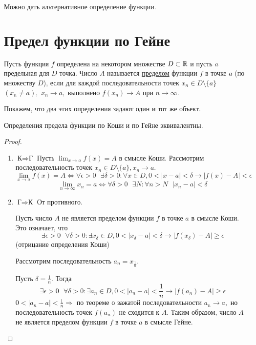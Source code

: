 	Можно дать альтернативное определение функции.
	
	\section{Предел функции по Гейне}
	
	\begin{theorem}
		Пусть функция $f$ определена на некотором множестве $D \subset \mathbb R$ и пусть $a$ предельная для $D$ точка. Число $A$ называется \underline{пределом} функции $f$ в точке $a$ (по множеству $D$), если для каждой последовательности точек $x_n \in D \setminus \{a\}$ $(x_n \neq a),$ $x_n \to a,$ выполнено $f(x_n) \to A$ при $n \to \infty.$
	\end{theorem}
	
	Покажем, что два этих определения задают один и тот же объект.
	
	\begin{theorem}
		Определения предела функции по Коши и по Гейне эквивалентны.
	\end{theorem}
	
	\begin{proof}
		\begin{enumerate}
			\item $\text{К} \Rightarrow \text{Г}$
			Пусть $\lim_{x \to a} f(x) = A$ в смысле Коши. Рассмотрим последовательность точек $x_n \in D \setminus \{a\}, x_n \to a.$
			\[ \lim_{x \to a} f(x) = A \Leftrightarrow \forall \epsilon > 0 \text{ } \exists \delta > 0: \forall x \in D, 0 < |x - a| < \delta \rightarrow |f(x) - A| < \epsilon \]
			\[ \lim_{n \to \infty} x_n = a \Leftrightarrow \forall \delta > 0 \text{ } \exists N: \forall n > N \text{ } |x_n - a| < \delta \]
			\item $\text{Г} \Rightarrow \text{К}$ От противного.
			
			Пусть число $A$ не является пределом функции $f$ в точке $a$ в смысле Коши. Это означает, что
			\[ \exists \epsilon > 0 \text{ } \forall \delta > 0: \exists x_{\delta} \in D, 0 < |x_{\delta} - a| < \delta \rightarrow |f(x_{\delta}) - A| \geqslant \epsilon \]
			(отрицание определения Коши)
			
			Рассмотрим последовательность $a_n = x_{\frac{1}{n}}$.
			
			Пусть $\delta = \frac{1}{n}.$ Тогда
			\[ \exists \epsilon > 0 \text{ } \forall \delta > 0: \exists a_n \in D, 0 < |a_n - a| < \frac{1}{n} \rightarrow |f(a_n) - A| \geqslant \epsilon \]
			$0 < |a_n - a| < \frac{1}{n} \Rightarrow$ по теореме о зажатой последовательности $a_n \to a,$ но последовательность точек $f(a_n)$ не сходится к $A$. Таким образом, число $A$ не является пределом функции $f$ в точке $a$ в смысле Гейне.
		\end{enumerate}
	\end{proof}
	
